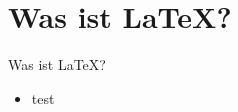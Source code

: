 
\section{Was ist \LaTeX ?}
%
\begin{frame}{Was ist \LaTeX ?}
	\begin{itemize}[<+->]
	\item test
	\end{itemize}
\end{frame}
